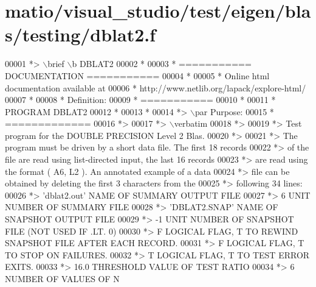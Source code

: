 \hypertarget{matio_2visual__studio_2test_2eigen_2blas_2testing_2dblat2_8f_source}{}\section{matio/visual\+\_\+studio/test/eigen/blas/testing/dblat2.f}
\label{matio_2visual__studio_2test_2eigen_2blas_2testing_2dblat2_8f_source}

\begin{DoxyCode}
00001 \textcolor{comment}{*> \(\backslash\)brief \(\backslash\)b DBLAT2}
00002 \textcolor{comment}{*}
00003 \textcolor{comment}{*  =========== DOCUMENTATION ===========}
00004 \textcolor{comment}{*}
00005 \textcolor{comment}{* Online html documentation available at }
00006 \textcolor{comment}{*            http://www.netlib.org/lapack/explore-html/ }
00007 \textcolor{comment}{*}
00008 \textcolor{comment}{*  Definition:}
00009 \textcolor{comment}{*  ===========}
00010 \textcolor{comment}{*}
00011 \textcolor{comment}{*       PROGRAM DBLAT2}
00012 \textcolor{comment}{* }
00013 \textcolor{comment}{*}
00014 \textcolor{comment}{*> \(\backslash\)par Purpose:}
00015 \textcolor{comment}{*  =============}
00016 \textcolor{comment}{*>}
00017 \textcolor{comment}{*> \(\backslash\)verbatim}
00018 \textcolor{comment}{*>}
00019 \textcolor{comment}{*> Test program for the DOUBLE PRECISION Level 2 Blas.}
00020 \textcolor{comment}{*>}
00021 \textcolor{comment}{*> The program must be driven by a short data file. The first 18 records}
00022 \textcolor{comment}{*> of the file are read using list-directed input, the last 16 records}
00023 \textcolor{comment}{*> are read using the format ( A6, L2 ). An annotated example of a data}
00024 \textcolor{comment}{*> file can be obtained by deleting the first 3 characters from the}
00025 \textcolor{comment}{*> following 34 lines:}
00026 \textcolor{comment}{*> 'dblat2.out'      NAME OF SUMMARY OUTPUT FILE}
00027 \textcolor{comment}{*> 6                 UNIT NUMBER OF SUMMARY FILE}
00028 \textcolor{comment}{*> 'DBLAT2.SNAP'     NAME OF SNAPSHOT OUTPUT FILE}
00029 \textcolor{comment}{*> -1                UNIT NUMBER OF SNAPSHOT FILE (NOT USED IF .LT. 0)}
00030 \textcolor{comment}{*> F        LOGICAL FLAG, T TO REWIND SNAPSHOT FILE AFTER EACH RECORD.}
00031 \textcolor{comment}{*> F        LOGICAL FLAG, T TO STOP ON FAILURES.}
00032 \textcolor{comment}{*> T        LOGICAL FLAG, T TO TEST ERROR EXITS.}
00033 \textcolor{comment}{*> 16.0     THRESHOLD VALUE OF TEST RATIO}
00034 \textcolor{comment}{*> 6                 NUMBER OF VALUES OF N}

\end{DoxyCode}
